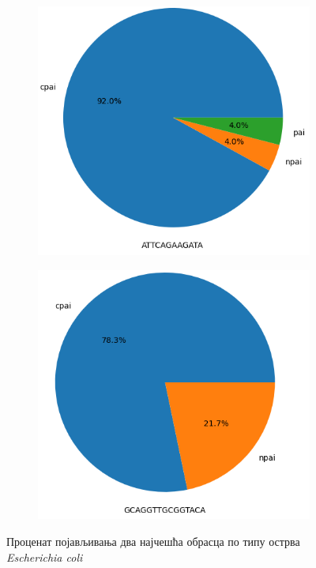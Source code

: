 \documentclass[12pt]{article}
\begin{document}
\begin{figure}[htbp]
    \centering
        \vspace{0.2cm}
    \begin{subfigure}{0.49\linewidth}
        \centering
        \includegraphics[width=\linewidth]{images/first_by_islands.png}
    \end{subfigure}
    \begin{subfigure}{0.49\linewidth}
        \centering
        \includegraphics[width=\linewidth]{images/second_by_islands.png}
    \end{subfigure}
    \caption{Проценат појављивања два најчешћа обрасца по типу острва \textit{Escherichia coli}}
\end{figure}
\end{document}
